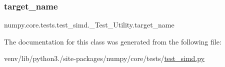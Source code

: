 \subsubsection{\texorpdfstring{target\+\_\+name}{target\_name}}
{\footnotesize\ttfamily numpy.\+core.\+tests.\+test\+\_\+simd.\+\_\+\+Test\+\_\+\+Utility.\+target\+\_\+name\hspace{0.3cm}{\ttfamily [static]}}



The documentation for this class was generated from the following file\+:\begin{DoxyCompactItemize}
\item 
venv/lib/python3./site-\/packages/numpy/core/tests/\hyperlink{test__simd_8py}{test\+\_\+simd.\+py}\end{DoxyCompactItemize}
